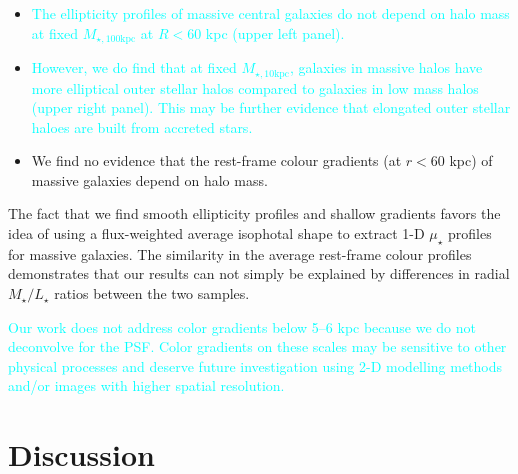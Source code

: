 \documentclass[a4paper,fleqn,usenatbib]{mnras}
\def\minn{{$M_{\star,10\mathrm{kpc}}$}}
\def\mtot{{$M_{\star,100\mathrm{kpc}}$}}
\def\m2l{{$M_{\star}/L_{\star}$}}
\def\mden{{$\mu_{\star}$}}
\newcommand{\song}[1]{\textcolor{cyan}{#1}}
\begin{document}
    \begin{itemize}
        \item \song{
            The ellipticity profiles of massive central galaxies do not depend on 
            halo mass at fixed \mtot{} at $R<60$ kpc (upper left panel). 
            }       
                
        \item \song{
            However, we do find that at fixed \minn{}, galaxies in massive halos have more elliptical outer stellar halos compared to galaxies in low mass halos (upper right panel). This may be further evidence that elongated outer stellar haloes are built from accreted stars.
            }
                     
        \item We find no evidence that the rest-frame colour gradients (at $r<60$ kpc) of massive galaxies depend on halo mass. 
            
    \end{itemize}
    
    The fact that we find smooth ellipticity profiles and shallow gradients favors 
    the idea of using a flux-weighted average isophotal shape to extract 1-D \mden{} 
    profiles for massive galaxies. The similarity in the average rest-frame colour profiles demonstrates that our results can not simply be explained by differences in radial \m2l{} ratios between the two samples.
    
    \song{
    Our work does not address color gradients below 5--6 kpc because we do not deconvolve 
    for the PSF. 
    Color gradients on these scales may be sensitive to other physical processes and 
    deserve future investigation using 2-D modelling methods and/or images with higher 
    spatial resolution.
    }
    
   

\section{Discussion}
    \label{sec:discussion}
\end{document}
